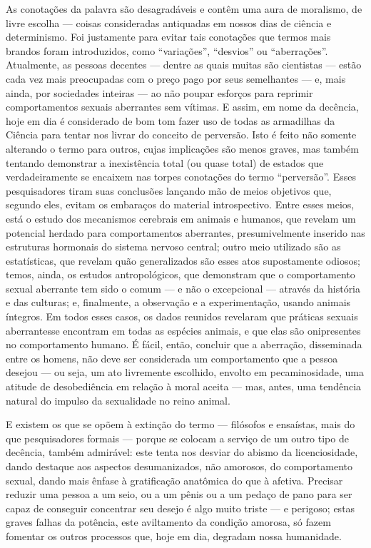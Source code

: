 As conotações da palavra\idxpervconot{} são desagradáveis e contêm uma aura de
moralismo, de livre escolha\idxlivre{} --- coisas consideradas antiquadas em nossos
dias de ciência e determinismo.\idxpervincid{} Foi justamente para evitar tais
conotações que termos mais brandos foram introduzidos, como
``variações'',\idxvaria{} ``desvios'' ou ``aberrações''. Atualmente, as pessoas
decentes --- dentre as quais muitas são cientistas --- estão cada vez mais
preocupadas com o preço pago por seus semelhantes --- e, mais ainda, por
sociedades inteiras --- ao não poupar esforços para reprimir
comportamentos sexuais aberrantes sem vítimas. E assim, em nome da
decência, hoje em dia é considerado de bom tom fazer uso de todas as
armadilhas da Ciência para tentar nos livrar do conceito de perversão.
Isto é feito não somente alterando o termo para outros, cujas
implicações são menos graves, mas também tentando demonstrar a
inexistência total (ou quase total) de estados que verdadeiramente se
encaixem nas torpes conotações do termo
``perversão''. Esses pesquisadores tiram suas
conclusões lançando mão de meios objetivos que, segundo eles, evitam
os embaraços do material introspectivo. Entre esses meios, está o
estudo dos mecanismos cerebrais em animais e humanos, que revelam um
potencial herdado para comportamentos aberrantes, presumivelmente
inserido nas estruturas hormonais do sistema nervoso central; outro
meio utilizado são as estatísticas, que revelam quão generalizados são
esses atos supostamente odiosos; temos, ainda, os estudos
antropológicos, que demonstram que o comportamento sexual aberrante tem
sido o comum --- e não o excepcional --- através da história e das
culturas; e, finalmente, a observação e a experimentação, usando
animais íntegros. Em todos esses casos, os dados reunidos revelaram que
práticas sexuais aberrantes\idxaberr[|)] se encontram em todas as espécies animais,
e que elas são onipresentes no comportamento humano. É fácil, então,
concluir que a aberração, disseminada entre os homens, não deve ser
considerada um comportamento que a pessoa desejou --- ou seja, um ato
livremente escolhido, envolto em pecaminosidade, uma atitude de
desobediência em relação à moral aceita ---\idxpervincid{} mas, antes, uma tendência
natural do impulso da sexualidade no reino animal.

E existem os que se opõem à extinção do termo --- filósofos e
ensaístas, mais do que pesquisadores formais --- porque se colocam a
serviço de um outro tipo de decência, também admirável: este tenta nos
desviar do abismo da licenciosidade, dando destaque aos aspectos
desumanizados,\idxdesu{} não amorosos, do comportamento sexual, dando mais ênfase
à gratificação anatômica do que à afetiva. Precisar reduzir uma pessoa
a um seio,\idxseios{} ou a um pênis ou a um pedaço de pano para ser capaz de
conseguir concentrar seu desejo é algo muito triste --- e perigoso; estas
graves falhas da potência, este aviltamento da condição amorosa, só
fazem fomentar os outros processos que, hoje em dia, degradam nossa humanidade.

